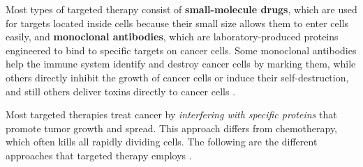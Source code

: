 Most types of targeted therapy consist of \textbf{small-molecule drugs}, which are used for targets located inside cells because their small size allows them to enter cells easily, and \textbf{monoclonal antibodies}, which are laboratory-produced proteins engineered to bind to specific targets on cancer cells. Some monoclonal antibodies help the immune system identify and destroy cancer cells by marking them, while others directly inhibit the growth of cancer cells or induce their self-destruction, and still others deliver toxins directly to cancer cells \cite{target_therapy1}.

Most targeted therapies treat cancer by \textit{interfering with specific proteins} that promote tumor growth and spread. This approach differs from chemotherapy, which often kills all rapidly dividing cells. The following are the different approaches that targeted therapy employs \cite{target_therapy1}.

